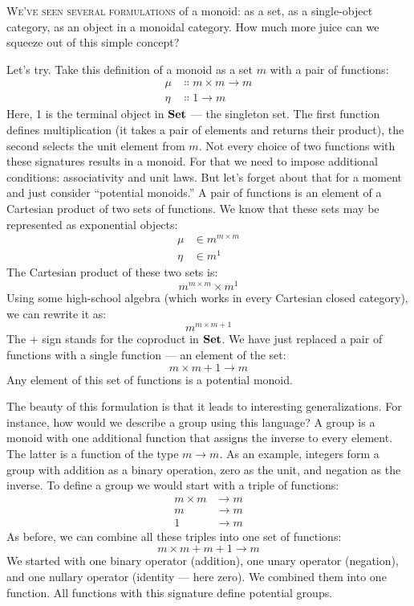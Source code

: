 
\lettrine[lhang=0.17]{W}{e've seen several formulations} of a monoid: as a set, as a
single-object category, as an object in a monoidal category. How much
more juice can we squeeze out of this simple concept?

Let's try. Take this definition of a monoid as a set $m$ with a
pair of functions:
\[
	\begin{aligned}
		\mu  & \Colon m\times{}m \to m \\
		\eta & \Colon 1 \to m
	\end{aligned}
\]
Here, 1 is the terminal object in $\mathbf{Set}$ --- the singleton set.
The first function defines multiplication (it takes a pair of elements
and returns their product), the second selects the unit element from
$m$. Not every choice of two functions with these signatures
results in a monoid. For that we need to impose additional conditions:
associativity and unit laws. But let's forget about that for a moment
and just consider ``potential monoids.'' A pair of functions is an
element of a Cartesian product of two sets of functions. We know that
these sets may be represented as exponential objects:
\[
	\begin{aligned}
		\mu  & \in m^{m\times{}m} \\
		\eta & \in m^1
	\end{aligned}
\]
The Cartesian product of these two sets is:
\[m^{m\times{}m}\times{}m^1\]
Using some high-school algebra (which works in every Cartesian closed
category), we can rewrite it as:
\[m^{m\times{}m + 1}\]
The $+$ sign stands for the coproduct in $\mathbf{Set}$. We have just
replaced a pair of functions with a single function --- an element of
the set:
\[m\times{}m + 1 \to m\]
Any element of this set of functions is a potential monoid.

The beauty of this formulation is that it leads to interesting
generalizations. For instance, how would we describe a group using this
language? A group is a monoid with one additional function that assigns
the inverse to every element. The latter is a function of the type
$m \to m$. As an example, integers form a group with
addition as a binary operation, zero as the unit, and negation as the
inverse. To define a group we would start with a triple of functions:
\[
	\begin{aligned}
		m\times{}m & \to m \\
		m          & \to m \\
		1          & \to m
	\end{aligned}
\]
As before, we can combine all these triples into one set of functions:
\[m\times{}m + m + 1 \to m\]
We started with one binary operator (addition), one unary operator
(negation), and one nullary operator (identity --- here zero). We
combined them into one function. All functions with this signature
define potential groups.

